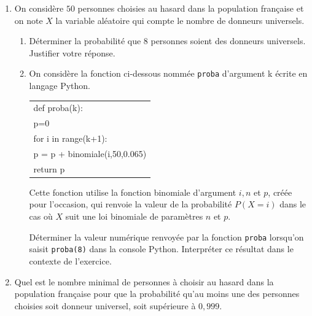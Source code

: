\begin{enumerate}
\item On considère $50$ personnes choisies au hasard dans la population française et on note $X$ la variable aléatoire qui compte le nombre de donneurs universels.
	\begin{enumerate}
		\item Déterminer la probabilité que 8 personnes soient des donneurs universels. Justifier votre réponse.
		\item On considère la fonction ci-dessous nommée \texttt{proba} d'argument k écrite en langage Python.
		
\begin{center}
\begin{tabular}{|l|}\hline
def proba(k):\\
\quad p=0\\
\quad for i in range(k+1):\\
\quad \quad p = p + binomiale(i,50,0.065)\\ 
\quad return p\\ \hline
\end{tabular}
\end{center}
Cette fonction utilise la fonction binomiale d'argument $i, n$ et $p$, créée pour l'occasion, qui renvoie la valeur de la probabilité $P(X = i)$ dans le cas où $X$ suit une loi binomiale de paramètres $n$ et $p$.

Déterminer la valeur numérique renvoyée par la fonction \texttt{proba} lorsqu'on saisit \texttt{proba(8)} dans la console Python. Interpréter ce résultat dans le contexte de l'exercice.
	\end{enumerate}
\item Quel est le nombre minimal de personnes à choisir au hasard dans la population française pour que la probabilité qu'au moins une des personnes choisies soit donneur universel, soit supérieure à $0,999$.
\end{enumerate}

\bigskip
